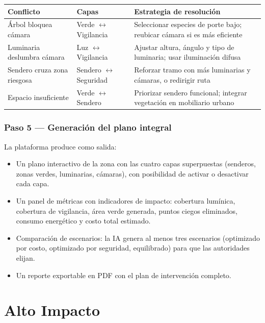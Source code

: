 \documentclass[12pt,a4paper]{article}
\begin{document}
\begin{table}[H]
\centering
\small
\begin{tabularx}{\textwidth}{l l X}
\toprule
\textbf{Conflicto} & \textbf{Capas} & \textbf{Estrategia de resolución} \\
\midrule
Árbol bloquea cámara & Verde $\leftrightarrow$ Vigilancia & Seleccionar especies de porte bajo; reubicar cámara si es más eficiente \\
Luminaria deslumbra cámara & Luz $\leftrightarrow$ Vigilancia & Ajustar altura, ángulo y tipo de luminaria; usar iluminación difusa \\
Sendero cruza zona riesgosa & Sendero $\leftrightarrow$ Seguridad & Reforzar tramo con más luminarias y cámaras, o redirigir ruta \\
Espacio insuficiente & Verde $\leftrightarrow$ Sendero & Priorizar sendero funcional; integrar vegetación en mobiliario urbano \\
\bottomrule
\end{tabularx}
\end{table}

\subsubsection{Paso 5 — Generación del plano integral}

La plataforma produce como salida:

\begin{itemize}[leftmargin=1.5cm]
    \item Un plano interactivo de la zona con las cuatro capas superpuestas (senderos, zonas verdes, luminarias, cámaras), con posibilidad de activar o desactivar cada capa.
    \item Un panel de métricas con indicadores de impacto: cobertura lumínica, cobertura de vigilancia, área verde generada, puntos ciegos eliminados, consumo energético y costo total estimado.
    \item Comparación de escenarios: la IA genera al menos tres escenarios (optimizado por costo, optimizado por seguridad, equilibrado) para que las autoridades elijan.
    \item Un reporte exportable en PDF con el plan de intervención completo.
\end{itemize}


\section{Alto Impacto}
\end{document}
